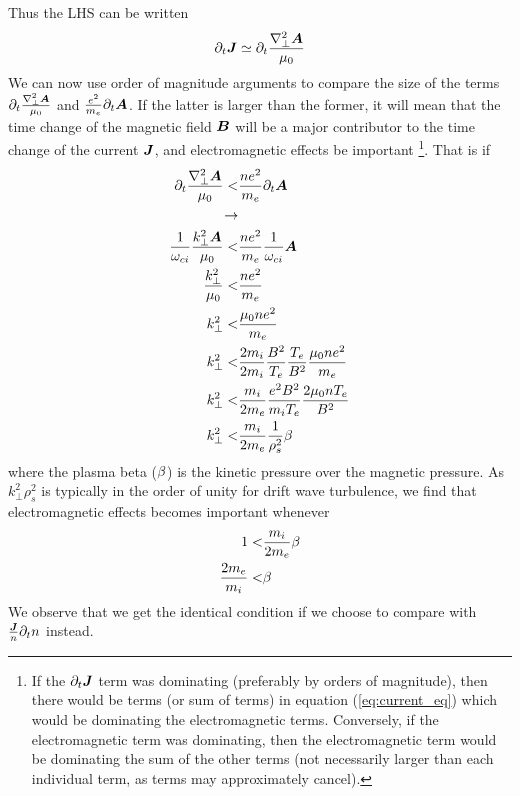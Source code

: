 %
Thus the LHS can be written
%
\begin{align*}
    \partial_t \boldsymbol{J} \simeq \partial_t \frac{\nabla^2_\perp\boldsymbol{A}}{\mu_0}
\end{align*}
%
We can now use order of magnitude arguments to compare the size of the terms $\partial_t \frac{\nabla^2_\perp\boldsymbol{A}}{\mu_0}$ and $\frac{e^2}{m_e}\partial_t \boldsymbol{A}$.
If the latter is larger than the former, it will mean that the time change of the magnetic field $\boldsymbol{B}$ will be a major contributor to the time change of the current $\boldsymbol{J}$, and electromagnetic effects be important%
%
\footnote{
    If the $\partial_t \boldsymbol{J}$ term was dominating (preferably by orders of magnitude), then there would be terms (or sum of terms) in equation (\ref{eq:current_eq}) which would be dominating the electromagnetic terms.
    Conversely, if the electromagnetic term was dominating, then the electromagnetic term would be dominating the sum of the other terms (not necessarily larger than each individual term, as terms may approximately cancel).
}.%
%
That is if
%
\begin{align*}
    \partial_t \frac{\nabla^2_\perp\boldsymbol{A}}{\mu_0}
    < &
    \frac{ne^2}{m_e}\partial_t \boldsymbol{A}
    \\
    \rightarrow &
    \\
    \frac{1}{\omega_{ci}} \frac{k_\perp^2\boldsymbol{A}}{\mu_0}
    < &
    \frac{ne^2}{m_e}\frac{1}{\omega_{ci}} \boldsymbol{A}
    \\
    \frac{k_\perp^2}{\mu_0}
    < &
    \frac{ne^2}{m_e}
    \\
    k_\perp^2
    < &
    \frac{\mu_0ne^2}{m_e}
    \\
    k_\perp^2
    < &
    \frac{2m_i}{2m_i}\frac{B^2}{T_e}\frac{T_e}{B^2}\frac{\mu_0ne^2}{m_e}
    \\
    k_\perp^2
    < &
    \frac{m_i}{2m_e}\frac{e^2B^2}{m_iT_e}\frac{2\mu_0nT_e}{B^2}
    \\
    k_\perp^2
    < &
    \frac{m_i}{2m_e}\frac{1}{\rho_s^2}\beta
\end{align*}
%
where the plasma beta ($\beta$) is the kinetic pressure over the magnetic pressure.
As $ k_\perp^2\rho_s^2$ is typically in the order of unity for drift wave turbulence, we find that electromagnetic effects becomes important whenever
%
\begin{align*}
    1
    < &
    \frac{m_i}{2m_e}\beta
    \\
    \frac{2m_e}{m_i}
    < &
    \beta
\end{align*}
%
We observe that we get the identical condition if we choose to compare with $\frac{\boldsymbol{J}}{n}\partial_t n$ instead.
